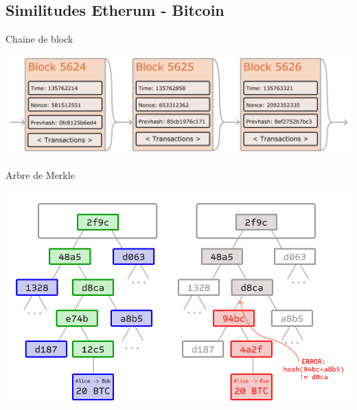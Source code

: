 \documentclass[presentation]{beamer}
\begin{document}
\subsection{Similitudes Etherum - Bitcoin}
\label{sec:orgb4f058e}
\begin{frame}[label={sec:org5c1a322}]{Chaine de block}
\begin{center}
\includegraphics[width=\textwidth]{Images/ethereum-blocks.png}
\end{center}
\end{frame}
\begin{frame}[label={sec:org7e0a9e5}]{Arbre de Merkle}
\begin{center}
\includegraphics[width=.9\linewidth]{Images/spv-bitcoin.png}
\end{center}
\end{frame}
\end{document}
